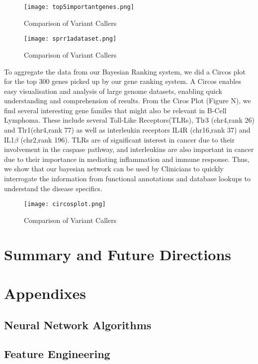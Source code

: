 \documentclass{article}
\begin{document}
\begin{figure}[H]
\texttt{[image: top5importantgenes.png]}
\caption{Comparison of Variant Callers}
\centering
\end{figure}

\begin{figure}[H]
\texttt{[image: sprr1adataset.png]}
\caption{Comparison of Variant Callers}
\centering
\end{figure}


To aggregate the data from our Bayesian Ranking system, we did a Circos plot for the top 300 genes picked up by our gene ranking system. A Circos enables easy visualisation and analysis of large genome datasets, enabling quick understanding and comprehension of results. From the Ciros Plot (Figure N), we find several interesting gene familes that might also be relevant in B-Cell Lymphoma. These include several Toll-Like Receptors(TLRs), Tlr3 (chr4,rank 26) and Tlr1(chr4,rank 77) as well as interleukin receptors IL4R (chr16,rank 37) and IL1$\beta$ (chr2,rank 196). TLRs are of significant interest in cancer due to their involvement in the caspase pathway, and interleukins are also important in cancer due to their importance in mediating inflammation and immune response. Thus, we show that our bayesian network can be used by Clinicians to quickly interrogate the information from functional annotations and database lookups to understand the disease specifics. 

\begin{figure}[H]
\texttt{[image: circosplot.png]}
\caption{Comparison of Variant Callers}
\centering
\end{figure}


\section{Summary and Future Directions}


\section{Appendixes}
\subsection{Neural Network Algorithms}

\subsection{Feature Engineering}
\end{document}
